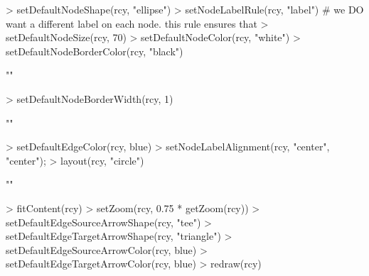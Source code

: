 \documentclass{article}
\begin{document}
\begin{Schunk}
\begin{Sinput}
> setDefaultNodeShape(rcy, "ellipse")
> setNodeLabelRule(rcy, "label")  # we DO want a different label on each node.  this rule ensures that
> setDefaultNodeSize(rcy, 70)
> setDefaultNodeColor(rcy, "white")
> setDefaultNodeBorderColor(rcy, "black")
\end{Sinput}
\begin{Soutput}
[1] ""
\end{Soutput}
\begin{Sinput}
> setDefaultNodeBorderWidth(rcy, 1)
\end{Sinput}
\begin{Soutput}
[1] ""
\end{Soutput}
\begin{Sinput}
> setDefaultEdgeColor(rcy, blue)
> setNodeLabelAlignment(rcy, "center", "center");
> layout(rcy, "circle")
\end{Sinput}
\begin{Soutput}
[1] ""
\end{Soutput}
\begin{Sinput}
> fitContent(rcy)
> setZoom(rcy, 0.75 * getZoom(rcy))
> setDefaultEdgeSourceArrowShape(rcy, "tee")
> setDefaultEdgeTargetArrowShape(rcy, "triangle")
> setDefaultEdgeSourceArrowColor(rcy, blue)
> setDefaultEdgeTargetArrowColor(rcy, blue)
> redraw(rcy)
\end{Sinput}
\end{Schunk}
\end{document}
